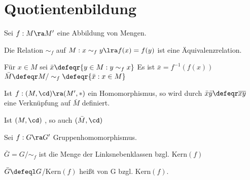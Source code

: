 \section{Quotientenbildung}

\begin{DefBem}
    Sei $f: M \ra M'$ eine Abbildung von Mengen.
    
    \begin{enum}
        \item Die Relation $\sim_f$ auf $M: x \sim_f y \lra f(x) = f(y)$ ist
        eine Äquivalenzrelation.

        \item Für $x \in M$ sei $\bar x \defeqr \{ y \in M : y\sim_f x\}$ Es ist
        $\bar x = f^{-1}(f(x))$ $\bar M \defeqr M/\sim_f \defeqr \{ \bar x : x \in M\}$

        \item Ist $f:(M,\cd) \ra (M', \ast)$ ein Homomorphismus, so wird durch
        $\bar x \bar y \defeqr \overline{xy}$ eine Verknüpfung auf $\bar M$ 
        definiert.\newline

        \item Ist $(M,\cd)$ \bla, so auch $(\bar M, \cd)$
    \end{enum}
\end{DefBem}

\begin{DefBem}
\label{1.14}
    Sei $f:G \ra G'$ Gruppenhomomorphismus.
    
    \begin{enum}
        \item $\bar G = G/\sim_f$ ist
        die Menge der Linksnebenklassen bzgl. Kern$(f)$

        \item  $\bar G \defeql G$/Kern$(f)$ heißt  von G bzgl.
        Kern$(f)$. \newline
    \end{enum}
\end{DefBem}

